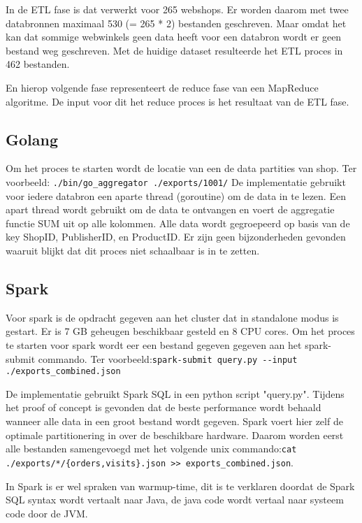 In de ETL fase is dat verwerkt voor 265 webshops. Er worden daarom met twee databronnen maximaal 530  (= 265 * 2) bestanden geschreven. Maar omdat het kan dat sommige webwinkels geen data heeft voor een databron wordt er geen bestand weg geschreven. Met de huidige dataset resulteerde het ETL proces in 462 bestanden.

En hierop volgende fase representeert de reduce fase van een MapReduce algoritme. De input voor dit het reduce proces is het resultaat van de ETL fase.

\subsection{Golang}

Om het proces te starten wordt de locatie van een de data partities van shop. Ter voorbeeld: \newline\verb+./bin/go_aggregator ./exports/1001/+
De implementatie gebruikt voor iedere databron een aparte thread (goroutine) om de data in te lezen. Een apart thread wordt gebruikt om de data te ontvangen en voert de aggregatie functie SUM uit op alle kolommen. Alle data wordt gegroepeerd op basis van de key ShopID, PublisherID, en ProductID. Er zijn geen bijzonderheden gevonden waaruit blijkt dat dit proces niet schaalbaar is in te zetten.

\subsection{Spark}

Voor spark is de opdracht gegeven aan het cluster dat in standalone modus is gestart. Er is 7 GB geheugen beschikbaar gesteld en 8 CPU cores. Om het proces te starten voor spark wordt eer een bestand gegeven gegeven aan het spark-submit commando. Ter voorbeeld:\newline\verb+spark-submit query.py --input ./exports_combined.json+

De implementatie gebruikt Spark SQL in een python script "query.py". Tijdens het proof of concept is gevonden dat de beste performance wordt behaald wanneer alle data in een groot bestand wordt gegeven. Spark voert hier zelf de optimale partitionering in over de beschikbare hardware. Daarom worden eerst alle bestanden samengevoegd met het volgende unix commando:\newline\verb+cat ./exports/*/{orders,visits}.json >> exports_combined.json+.

In Spark is er wel spraken van warmup-time, dit is te verklaren doordat de Spark SQL syntax wordt vertaalt naar Java, de java code wordt vertaal naar systeem code door de JVM.


